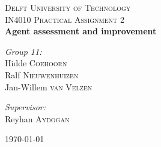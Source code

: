 \documentclass[11pt,a4paper]{article}
\begin{document}
\begin{titlepage}
\begin{center}



\textsc{\LARGE Delft University of Technology}\\[1.5cm]

\textsc{\Large IN4010 Practical Assignment 2}\\[0.5cm]

{ \huge \bfseries Agent assessment and improvement \\[0.4cm] }


\noindent
\begin{minipage}{0.4\textwidth}
\begin{flushleft} \large
\emph{Group 11:}\\
Hidde \textsc{Coehoorn}\\
Ralf \textsc{Nieuwenhuizen}\\
Jan-Willem \textsc{van Velzen}
\end{flushleft}
\end{minipage}%
\begin{minipage}{0.4\textwidth}
\begin{flushright} \large
\emph{Supervisor:} \\
Reyhan \textsc{Aydogan}
\end{flushright}
\end{minipage}

\vfill

{\large \today}

\end{center}
\end{titlepage}

\newpage


\newpage


\newpage




\newpage

\end{document}
